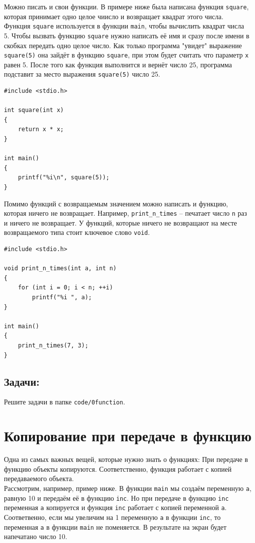 \documentclass{article}
\begin{document}
Можно писать и свои функции. В примере ниже была написана функция \texttt{square}, которая принимает одно целое чиисло и возвращает квадрат этого числа. Функция \texttt{square} используется в функции \texttt{main}, чтобы вычислить квадрат числа 5. Чтобы вызвать функцию \texttt{square} нужно написать её имя и сразу после имени в скобках передать одно целое число. Как только программа "увидет" выражение \texttt{square(5)} она зайдёт в функцию \texttt{square}, при этом будет считать что параметр \texttt{x} равен 5. После того как функция выполнится и вернёт число 25, программа подставит за место выражения \texttt{square(5)} число 25.
\begin{lstlisting}
#include <stdio.h>

int square(int x)
{
    return x * x;
}

int main()
{
    printf("%i\n", square(5));
}
\end{lstlisting}



Помимо функций с возвращаемым значением можно написать и функцию, которая ничего не возвращает. Например, \texttt{print\_n\_times} -- печатает число \texttt{n} раз и ничего не возвращает. У функций, которые ничего не возвращают на месте возвращаемого типа стоит ключевое слово \texttt{void}.
\begin{lstlisting}
#include <stdio.h>

void print_n_times(int a, int n) 
{
    for (int i = 0; i < n; ++i)
        printf("%i ", a);
}

int main() 
{
    print_n_times(7, 3);
}
\end{lstlisting}


\subsection*{Задачи:}
Решите задачи в папке \texttt{code/0function}.

\newpage
\section*{Копирование при передаче в функцию}
Одна из самых важных вещей, которые нужно знать о функциях: При передаче в функцию объекты копируются.
Соответственно, функция работает с копией передаваемого объекта.\\

Рассмотрим, например, пример ниже. В функции \texttt{main} мы создаём переменную \texttt{a}, равную 10 и передаём её в функцию \texttt{inc}. Но при передаче в функцию \texttt{inc} переменная \texttt{a} копируется и функция \texttt{inc} работает с копией переменной \texttt{a}. Соответвенно, если мы увеличим на 1 переменную \texttt{a} в функции \texttt{inc}, то переменная \texttt{a} в функции \texttt{main} не поменяется. В результате на экран будет напечатано число 10.
\end{document}
